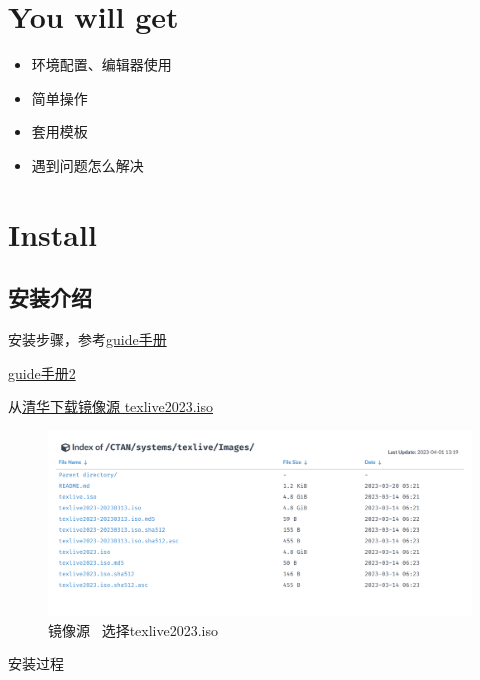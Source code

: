 \documentclass[11pt]{ctexart}
\begin{document}
\tableofcontents
	
\section{You will get}

\begin{itemize}
	\item 环境配置、编辑器使用
	\item 简单操作
	\item 套用模板
	\item  遇到问题怎么解决
\end{itemize}

\newpage

\section{Install}

\subsection{安装介绍}



安装步骤，参考\href{https://github.com/OsbertWang/install-latex-guide-zh-cn/releases}{guide手册}

\href{https://www.tug.org/texlive/doc/texlive-zh-cn/texlive-zh-cn.pdf}{guide手册2}

从\href{https://mirrors.tuna.tsinghua.edu.cn/CTAN/systems/texlive/Images/}{清华下载镜像源 texlive2023.iso}

\begin{figure}[ht]
	\centering
	\includegraphics[width=1.0\textwidth]{images/texlive2023Images.png}
	\caption{镜像源~ 选择texlive2023.iso}
	\label{fig:2023image}
\end{figure}

安装过程
\end{document}
